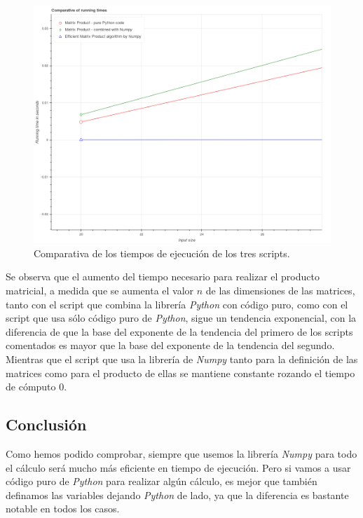 \documentclass[12pt,twoside]{article}
\begin{document}
\begin{figure}[hbt]
\begin{center}
	\includegraphics[width=1\textwidth]{42.png}
	\caption{Comparativa de los tiempos de ejecución de los tres scripts.}
	\label{fig:fig6}
\end{center}
\end{figure}

Se observa que el aumento del tiempo necesario para realizar el producto matricial, a medida que se aumenta el valor $n$ de las dimensiones de las matrices, tanto con el script que combina la librería \textit{Python} con código puro, como con el script que usa sólo código puro de \textit{Python}, sigue un tendencia exponencial, con la diferencia de que la base del exponente de la tendencia del primero de los scripts comentados es mayor que la base del exponente de la tendencia del segundo. Mientras que el script que usa la librería de \textit{Numpy} tanto para la definición de las matrices como para el producto de ellas se mantiene constante rozando el tiempo de cómputo 0.

\subsection{Conclusión}
Como hemos podido comprobar, siempre que usemos la librería \textit{Numpy} para todo el cálculo será mucho más eficiente en tiempo de ejecución. Pero si vamos a usar código puro de \textit{Python} para realizar algún cálculo, es mejor que también definamos las variables dejando \textit{Python} de lado, ya que la diferencia es bastante notable en todos los casos.
\end{document}
